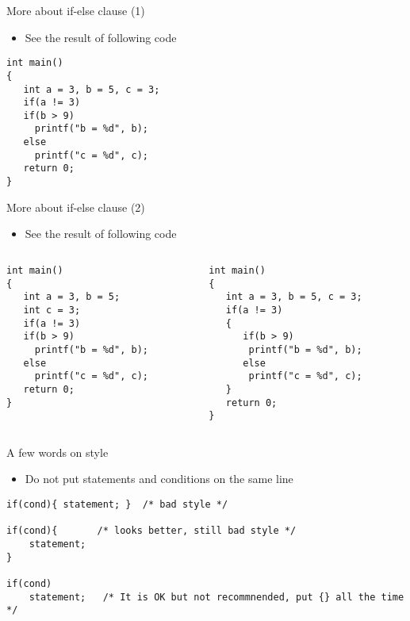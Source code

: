 \begin{frame}[fragile]{More about if-else clause (1)}
\begin{itemize}
	\item {See the result of following code}
\end{itemize}
\begin{lstlisting}
int main()
{  
   int a = 3, b = 5, c = 3;
   if(a != 3)
   if(b > 9)
     printf("b = %d", b);
   else 
     printf("c = %d", c);
   return 0;
}
\end{lstlisting}
\end{frame}

\begin{frame}[fragile]{More about if-else clause (2)}
\begin{itemize}
	\item {See the result of following code}
\end{itemize}
\begin{columns}
\begin{column}{0.48\linewidth}
\begin{lstlisting}[xleftmargin=0.05\linewidth]
int main()
{  
   int a = 3, b = 5;
   int c = 3;
   if(a != 3)
   if(b > 9)
     printf("b = %d", b);
   else 
     printf("c = %d", c);
   return 0;
}
\end{lstlisting}
\end{column}
\begin{column}{0.5\linewidth}
\begin{lstlisting}[xleftmargin=0.05\linewidth]
int main()
{  
   int a = 3, b = 5, c = 3;
   if(a != 3)
   {
      if(b > 9)
       printf("b = %d", b);
      else 
       printf("c = %d", c);
   }
   return 0;
}
\end{lstlisting}
\end{column}
\end{columns}
\end{frame}

\begin{frame}[fragile]{A few words on style}
	\begin{itemize}
		\item {Do not put statements and conditions on the same line}
	\end{itemize}
	\begin{lstlisting}[numbers=none]
if(cond){ statement; }	/* bad style */

if(cond){		/* looks better, still bad style */
    statement;
}

if(cond)
	statement;   /* It is OK but not recommnended, put {} all the time */
\end{lstlisting}
\end{frame}

